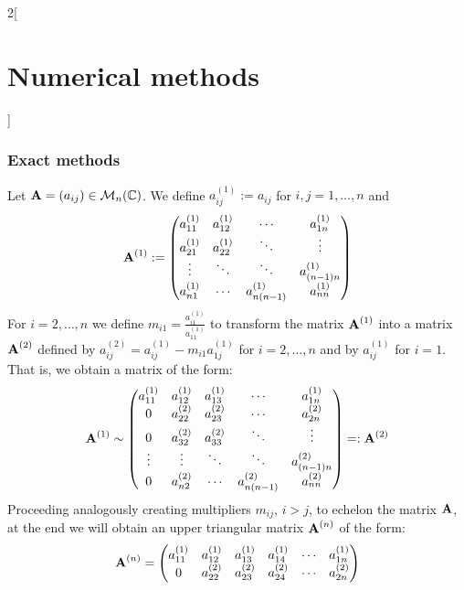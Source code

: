 \documentclass[../../../main.tex]{subfiles}
\begin{document}
\begin{multicols}{2}[\section{Numerical methods}]
  \subsubsection{Exact methods}
  \begin{method}
    Let $\vectorfunction{A}=(a_{ij})\in\mathcal{M}_n(\CC)$. We define $a_{ij}^{(1)}:=a_{ij}$ for $i,j=1,\ldots,n$ and
    $$\vectorfunction{A}^{(1)}:=
      \begin{pmatrix}
        a_{11}^{(1)} & a_{12}^{(1)} & \cdots           & a_{1n}^{(1)}     \\
        a_{21}^{(1)} & a_{22}^{(1)} & \ddots           & \vdots           \\
        \vdots       & \ddots       & \ddots           & a_{(n-1)n}^{(1)} \\
        a_{n1}^{(1)} & \cdots       & a_{n(n-1)}^{(1)} & a_{nn}^{(1)}
      \end{pmatrix}
    $$
    For $i=2,\ldots,n$ we define $m_{i1}=\frac{a_{i1}^{(1)}}{a_{11}^{(1)}}$ to transform the matrix $\vectorfunction{A}^{(1)}$ into a matrix $\vectorfunction{A}^{(2)}$ defined by $a_{ij}^{(2)}=a_{ij}^{(1)}-m_{i1}a_{1j}^{(1)}$ for $i=2,\ldots,n$ and by $a_{ij}^{(1)}$ for $i=1$. That is, we obtain a matrix of the form:
    $$\vectorfunction{A}^{(1)}\sim
      \begin{pmatrix}
        a_{11}^{(1)} & a_{12}^{(1)} & a_{13}^{(1)} & \cdots           & a_{1n}^{(1)}     \\
        0            & a_{22}^{(2)} & a_{23}^{(2)} & \cdots           & a_{2n}^{(2)}     \\
        0            & a_{32}^{(2)} & a_{33}^{(2)} & \ddots           & \vdots           \\
        \vdots       & \vdots       & \ddots       & \ddots           & a_{(n-1)n}^{(2)} \\
        0            & a_{n2}^{(2)} & \cdots       & a_{n(n-1)}^{(2)} & a_{nn}^{(2)}
      \end{pmatrix} =:\vectorfunction{A}^{(2)}
    $$
    Proceeding analogously creating multipliers $m_{ij}$, $i>j$, to echelon the matrix $\vectorfunction{A}$, at the end we will obtain an upper triangular matrix $\vectorfunction{A}^{(n)}$ of the form:
    $$\vectorfunction{A}^{(n)}=
      \begin{pmatrix}
        a_{11}^{(1)} & a_{12}^{(1)} & a_{13}^{(1)} & a_{14}^{(1)} & \cdots                 & a_{1n}^{(1)}       \\
        0            & a_{22}^{(2)} & a_{23}^{(2)} & a_{24}^{(2)} & \cdots                 & a_{2n}^{(2)}       \\

\end{pmatrix}$$
\end{method}
\end{multicols}
\end{document}
